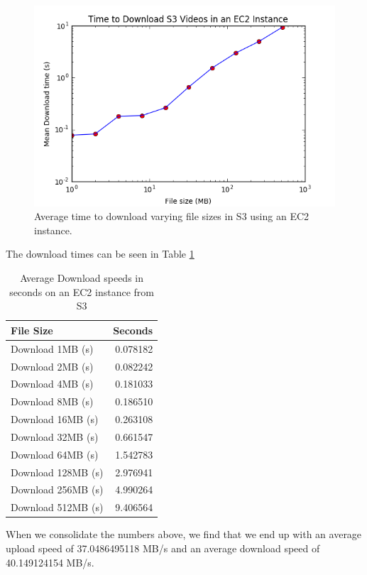 \begin{figure}[h]
  \centering
  \includegraphics[width=.8\textwidth]{figures/s3_download_speed}
  \caption{Average time to download varying file sizes in S3 using an EC2 instance. }
  \label{fig:s3_download_speed}
\end{figure}

The download times can be seen in Table \ref{tab:download_speed}
\begin{table}[h]
  \begin{tabular}{lr}
  \toprule
  {File Size} &         Seconds \\
  \midrule
  Download 1MB (s)   &  0.078182 \\
  Download 2MB (s)   &  0.082242 \\
  Download 4MB (s)   &  0.181033 \\
  Download 8MB (s)   &  0.186510 \\
  Download 16MB (s)  &  0.263108 \\
  Download 32MB (s)  &  0.661547 \\
  Download 64MB (s)  &  1.542783 \\
  Download 128MB (s) &  2.976941 \\
  Download 256MB (s) &  4.990264 \\
  Download 512MB (s) &  9.406564 \\
  \bottomrule
  \end{tabular}
\caption{Average Download speeds in seconds on an EC2 instance from S3}
\label{tab:download_speed}
\end{table}


When we consolidate the numbers above, we find that we end up with an average
upload speed of 37.0486495118 MB/s and an average download speed of 40.149124154 MB/s.

\FloatBarrier

